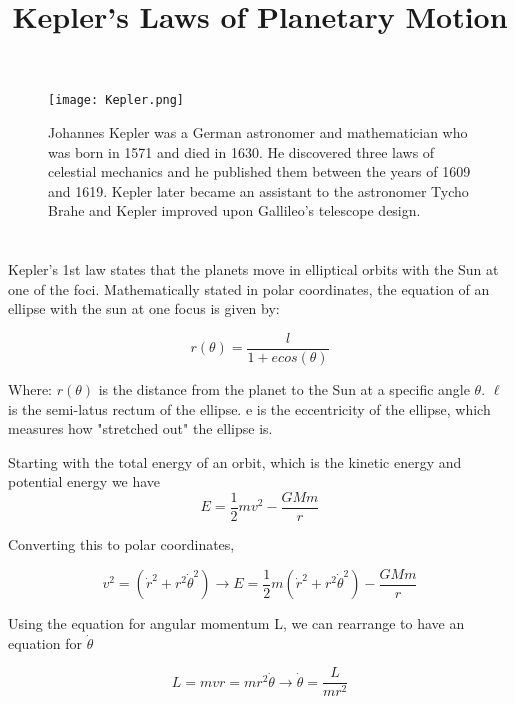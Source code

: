 \documentclass{article}
\title{Kepler's Laws of Planetary Motion}
\date{\vspace{-12ex}}
\begin{document}
\maketitle


\begin{figure}[!hb]
\centering
\label{curve}
    \texttt{[image: Kepler.png]}
\begin{minipage}[b]{5cm}
\begin{trivlist}  
\item Johannes Kepler was a German astronomer and mathematician who was born in 1571 and died in 1630. He discovered three laws of celestial mechanics and he published them between the years of 1609 and 1619. Kepler later became an assistant to the astronomer Tycho Brahe and Kepler improved upon Gallileo's telescope design.
\end{trivlist}
\end{minipage}
\end{figure}




\section*{}

Kepler's 1st law states that the planets move in elliptical orbits with the Sun at one of the foci. 
Mathematically stated in polar coordinates, the equation of an ellipse with the sun at one focus is given by: 

$$r(\theta) = \frac{l}{1+ecos(\theta)}$$

Where: 
$r(\theta)$ is the distance from the planet to the Sun at a specific angle $\theta$.
$\ell$ is the semi-latus rectum of the ellipse.
e is the eccentricity of the ellipse, which measures how "stretched out" the ellipse is. \newline

Starting with the total energy of an orbit, which is the kinetic energy and potential energy we have $$E = \frac{1}{2}mv^2 - \frac{GMm}{r}$$

Converting this to polar coordinates, 

$$v^2 = (\dot{r}^2 + r^2{\dot{\theta}}^2) \rightarrow E = \frac{1}{2}m(\dot{r}^2 + r^2{\dot{\theta}}^2) - \frac{GMm}{r} $$

Using the equation for angular momentum L, we can rearrange to have an equation for $\dot{\theta}$

$$L = mvr = m r^2 \dot{\theta} \rightarrow \dot{\theta} = \frac{L}{mr^2}$$
\end{document}
